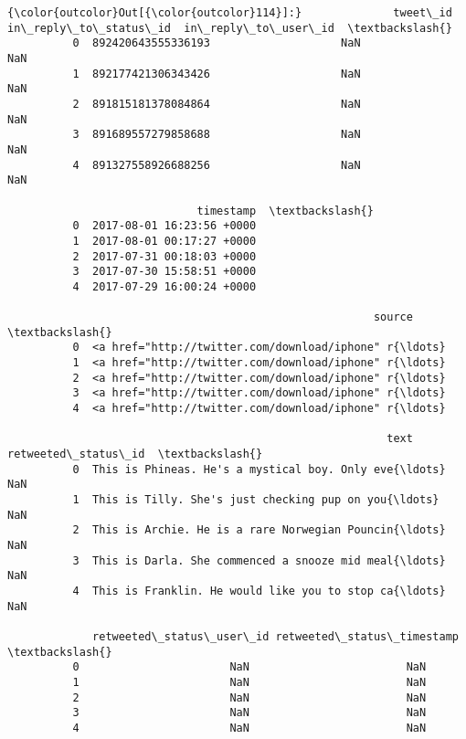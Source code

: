 \documentclass[11pt]{article}
\begin{document}
\begin{Verbatim}[commandchars=\\\{\}]
{\color{outcolor}Out[{\color{outcolor}114}]:}              tweet\_id  in\_reply\_to\_status\_id  in\_reply\_to\_user\_id  \textbackslash{}
          0  892420643555336193                    NaN                  NaN   
          1  892177421306343426                    NaN                  NaN   
          2  891815181378084864                    NaN                  NaN   
          3  891689557279858688                    NaN                  NaN   
          4  891327558926688256                    NaN                  NaN   
          
                             timestamp  \textbackslash{}
          0  2017-08-01 16:23:56 +0000   
          1  2017-08-01 00:17:27 +0000   
          2  2017-07-31 00:18:03 +0000   
          3  2017-07-30 15:58:51 +0000   
          4  2017-07-29 16:00:24 +0000   
          
                                                        source  \textbackslash{}
          0  <a href="http://twitter.com/download/iphone" r{\ldots}   
          1  <a href="http://twitter.com/download/iphone" r{\ldots}   
          2  <a href="http://twitter.com/download/iphone" r{\ldots}   
          3  <a href="http://twitter.com/download/iphone" r{\ldots}   
          4  <a href="http://twitter.com/download/iphone" r{\ldots}   
          
                                                          text  retweeted\_status\_id  \textbackslash{}
          0  This is Phineas. He's a mystical boy. Only eve{\ldots}                  NaN   
          1  This is Tilly. She's just checking pup on you{\ldots}                  NaN   
          2  This is Archie. He is a rare Norwegian Pouncin{\ldots}                  NaN   
          3  This is Darla. She commenced a snooze mid meal{\ldots}                  NaN   
          4  This is Franklin. He would like you to stop ca{\ldots}                  NaN   
          
             retweeted\_status\_user\_id retweeted\_status\_timestamp  \textbackslash{}
          0                       NaN                        NaN   
          1                       NaN                        NaN   
          2                       NaN                        NaN   
          3                       NaN                        NaN   
          4                       NaN                        NaN   
          

\end{Verbatim}
\end{document}
